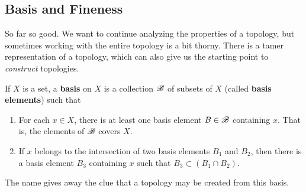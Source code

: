\subsection{Basis and Fineness} 

  So far so good. We want to continue analyzing the properties of a topology, but sometimes working with the entire topology is a bit thorny. There is a tamer representation of a topology, which can also give us the starting point to \textit{construct} topologies. 

  \begin{definition}[Basis]
    If $X$ is a set, a \textbf{basis} on $X$ is a collection $\operatorname{\mathscr{B}}$ of subsets of $X$ (called \textbf{basis elements}) such that
    \begin{enumerate}
      \item For each $x \in X$, there is at least one basis element $B \in \operatorname{\mathscr{B}}$ containing $x$. That is, the elements of $\operatorname{\mathscr{B}}$ covers $X$. 
      \item If $x$ belongs to the intersection of two basis elements $B_1$ and $B_2$, then there is a basis element $B_3$ containing $x$ such that $B_3 \subset (B_1 \cap B_2)$. 
    \end{enumerate}
  \end{definition} 

  The name gives away the clue that a topology may be created from this basis.  

